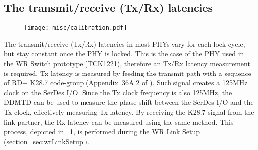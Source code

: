 
\subsection{The transmit/receive (Tx/Rx) latencies} 
\label{sec:TxRxLatencies}

\begin{figure}[!t]
\centering
\texttt{[image: misc/calibration.pdf]}
\caption{}
\label{fig:calibration}
\end{figure}

The transmit/receive (Tx/Rx) latencies in most PHYs vary for
each  
lock cycle, but stay constant once the PHY is
locked. This is the case of the PHY used in the WR Switch prototype
(TCK1221), therefore an Tx/Rx latency measurement is required. Tx
latency is measured by feeding the transmit path with a sequence of
RD+ K28.7 code-group (Appendix~36A.2 of \cite{biblio:IEEE8023}). 
Such signal creates a 125MHz clock on
the SerDes I/O. Since the Tx clock frequency is also 125MHz, the DDMTD
can be used to measure the phase shift between the SerDes I/O and the
Tx clock, effectively measuring Tx latency. By receiving the K28.7
signal from the link partner, the Rx latency can be measured using the
same method. This process, depicted in \figurename~\ref{fig:calibration},
is performed during the WR Link Setup (section~\ref{sec:wrLinkSetup}).


